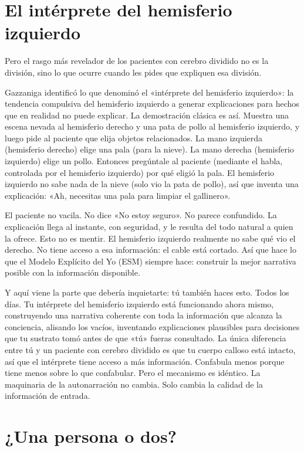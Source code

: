 \documentclass[11pt, twoside, openright]{book}
\begin{document}
\section*{El intérprete del hemisferio izquierdo}

Pero el rasgo más revelador de los pacientes con cerebro dividido no es la división, sino lo que ocurre cuando les pides que expliquen esa división.

Gazzaniga identificó lo que denominó el «intérprete del hemisferio izquierdo»: la tendencia compulsiva del hemisferio izquierdo a generar explicaciones para hechos que en realidad no puede explicar. La demostración clásica es así. Muestra una escena nevada al hemisferio derecho y una pata de pollo al hemisferio izquierdo, y luego pide al paciente que elija objetos relacionados. La mano izquierda (hemisferio derecho) elige una pala (para la nieve). La mano derecha (hemisferio izquierdo) elige un pollo. Entonces pregúntale al paciente (mediante el habla, controlada por el hemisferio izquierdo) por qué eligió la pala. El hemisferio izquierdo no sabe nada de la nieve (solo vio la pata de pollo), así que inventa una explicación: «Ah, necesitas una pala para limpiar el gallinero».

El paciente no vacila. No dice «No estoy seguro». No parece confundido. La explicación llega al instante, con seguridad, y le resulta del todo natural a quien la ofrece. Esto no es mentir. El hemisferio izquierdo realmente no sabe qué vio el derecho. No tiene acceso a esa información: el cable está cortado. Así que hace lo que el Modelo Explícito del Yo (ESM) siempre hace: construir la mejor narrativa posible con la información disponible.

Y aquí viene la parte que debería inquietarte: tú también haces esto. Todos los días. Tu intérprete del hemisferio izquierdo está funcionando ahora mismo, construyendo una narrativa coherente con toda la información que alcanza la conciencia, alisando los vacíos, inventando explicaciones plausibles para decisiones que tu sustrato tomó antes de que «tú» fueras consultado. La única diferencia entre tú y un paciente con cerebro dividido es que tu cuerpo calloso está intacto, así que el intérprete tiene acceso a más información. Confabula menos porque tiene menos sobre lo que confabular. Pero el mecanismo es idéntico. La maquinaria de la autonarración no cambia. Solo cambia la calidad de la información de entrada.

\section*{¿Una persona o dos?}
\end{document}
